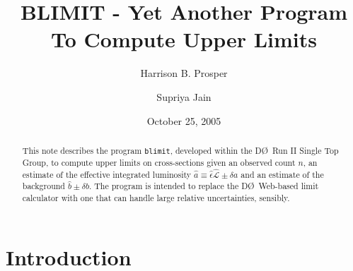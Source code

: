 \documentclass[preprint,eqsecnum,aps]{revtex4}
\newcommand{\ha}{\hat{a}}
\newcommand{\hb}{\hat{b}}
\newcommand{\lum}{{\mathcal L}}
\begin{document}
{}
\title{BLIMIT - Yet Another Program To Compute Upper Limits}

\author{Harrison B. Prosper}

\author{Supriya Jain}

\date{October 25, 2005}

\begin{abstract}
This note describes the program {\tt blimit}, developed within the
D\O\ Run II Single Top Group, to compute upper limits on
cross-sections given an observed count $n$, an estimate of the effective 
integrated luminosity 
$\ha \equiv \hat{\epsilon} \hat{\lum} \pm \delta a$ 
and an estimate of the background
$\hb \pm \delta b$. The program is intended to replace the D\O\ Web-based
limit calculator with one that can handle large relative uncertainties,
sensibly.
\end{abstract}

\maketitle

\section{Introduction}
\end{document}
